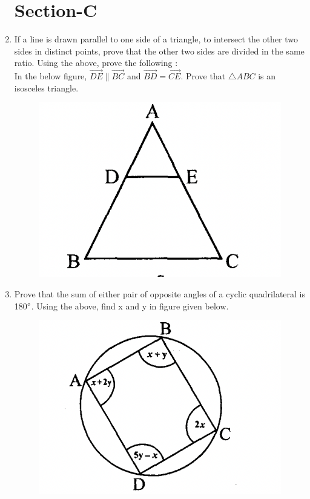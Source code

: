 \documentclass[journal,12pt,twocolumn]{IEEEtran}
\begin{document}
\begin{enumerate}
 \section{Section-C}
 \item If a line is drawn parallel to one side of a triangle, to intersect the other two sides in distinct points, prove that the other two sides are divided in the same ratio. Using the above, prove the following :\\ In the below figure, $\vec{DE} \| \vec{BC}$ and $\vec{BD}=\vec{CE}$. Prove that $\triangle{ABC}$ is an isosceles triangle.
 \begin{figure}[h!]
    \centering
    \includegraphics[width=\columnwidth]{8.png}
    \caption{}
 \end{figure}
 
 \item Prove that the sum of either pair of opposite angles of a cyclic quadrilateral is 180$\degree$. Using the above, find x and y in figure given below.
 \begin{figure}[H]
    \centering
    \includegraphics[width=\columnwidth]{9.png}
    \caption{}
 \end{figure}
 

\end{enumerate}
\end{document}

